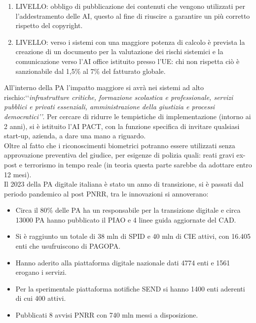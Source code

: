 \documentclass{article}
\begin{document}
\begin{justify}
\begin{itemize}
        \begin{enumerate}
            \item LIVELLO: obbligo di pubblicazione dei contenuti che vengono utilizzati per \\l'addestramento delle AI, questo al fine di riuscire a garantire un più corretto rispetto del copyright.
            \item LIVELLO: verso i sistemi con una maggiore potenza di calcolo è prevista la creazione di un documento per la valutazione dei rischi sistemici e la comunicazione verso l'AI office istituito presso l'UE: chi non rispetta ciò è sanzionabile dal 1,5\% al 7\% del fatturato globale.\citep{La_repubblica} 
        \end{enumerate}
    \end{itemize}
    All'interno della PA l'impatto maggiore si avrà nei sistemi ad alto rischio:‘‘\textit{infrastrutture critiche, formazione scolastica e professionale, servizi pubblici e privati essenziali, amministrazione della giustizia e processi democratici’’}. Per cercare di ridurre le tempistiche di implementazione (intorno ai 2 anni), si è istituito l'AI PACT, con la funzione specifica di invitare qualsiasi start-up, azienda, a dare una mano a riguardo.\citep{marchetti_ai_2023}\\
    Oltre al fatto che i riconoscimenti biometrici potranno essere utilizzati senza approvazione preventiva del giudice, per esigenze di polizia quali: reati gravi ex-post e terrorismo in tempo reale (in teoria questa parte sarebbe da adottare entro 12 mesi).\\
    Il 2023 della PA digitale italiana è stato un anno di transizione, si è passati dal periodo pandemico al post PNRR, tra le innovazioni si annoverano:
    \begin{itemize}
        \item Circa il 80\% delle PA ha un responsabile per la transizione digitale e circa 13000 PA hanno pubblicato il PIAO e 4 linee guida aggiornate del CAD.
        \item Si è raggiunto un totale di 38 mln di SPID e 40 mln di CIE attivi, con 16.405 enti che usufruiscono di PAGOPA.
        \item Hanno aderito alla piattaforma digitale nazionale dati 4774 enti e 1561 erogano i servizi.
        \item Per la sperimentale piattaforma notifiche SEND si hanno 1400 enti aderenti di cui 400 attivi.
        \item Pubblicati 8 avvisi PNRR con 740 mln messi a disposizione.\citep{AttuazionePNRR}
    \end{itemize}
\end{justify}
\end{document}
